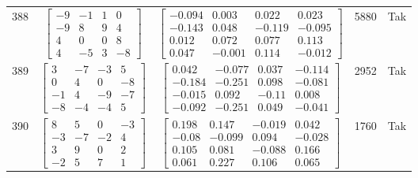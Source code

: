 \documentclass[a4paper,12pt]{article}
\begin{document}
\begin{tabular}{c c c c c}
388
&
$\begin{bmatrix} -9 & -1 & 1 & 0 \\ -9 & 8 & 9 & 4 \\ 4 & 0 & 0 & 8 \\ 4 & -5 & 3 & -8 \end{bmatrix}$
&
$\begin{bmatrix} -0.094 & 0.003 & 0.022 & 0.023 \\ -0.143 & 0.048 & -0.119 & -0.095 \\ 0.012 & 0.072 & 0.077 & 0.113 \\ 0.047 & -0.001 & 0.114 & -0.012 \end{bmatrix}$
&
5880
&
Tak
\\
389
&
$\begin{bmatrix} 3 & -7 & -3 & 5 \\ 0 & 4 & 0 & -8 \\ -1 & 4 & -9 & -7 \\ -8 & -4 & -4 & 5 \end{bmatrix}$
&
$\begin{bmatrix} 0.042 & -0.077 & 0.037 & -0.114 \\ -0.184 & -0.251 & 0.098 & -0.081 \\ -0.015 & 0.092 & -0.11 & 0.008 \\ -0.092 & -0.251 & 0.049 & -0.041 \end{bmatrix}$
&
2952
&
Tak
\\
390
&
$\begin{bmatrix} 8 & 5 & 0 & -3 \\ -3 & -7 & -2 & 4 \\ 3 & 9 & 0 & 2 \\ -2 & 5 & 7 & 1 \end{bmatrix}$
&
$\begin{bmatrix} 0.198 & 0.147 & -0.019 & 0.042 \\ -0.08 & -0.099 & 0.094 & -0.028 \\ 0.105 & 0.081 & -0.088 & 0.166 \\ 0.061 & 0.227 & 0.106 & 0.065 \end{bmatrix}$
&
1760
&
Tak
\\
\end{tabular} \egroup \newpage
\end{document}
